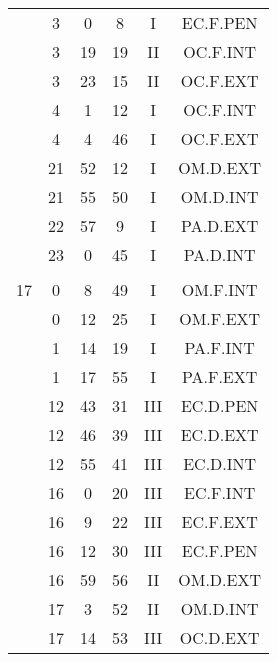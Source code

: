 \documentclass[12pt, a4paper]{article}
\begin{document}
\begin{multicols}{3}
{\begin{tabular}{c c c c c c}
	 	 	 	 & 3 & 0 & 8 & I & EC.F.PEN\\%
	 	 	 	 & 3 & 19 & 19 & II & OC.F.INT\\%
	 	 	 	 & 3 & 23 & 15 & II & OC.F.EXT\\%
	 	 	 	 & 4 & 1 & 12 & I & OC.F.INT\\%
	 	 	 	 & 4 & 4 & 46 & I & OC.F.EXT\\%
	 	 	 	 & 21 & 52 & 12 & I & OM.D.EXT\\%
	 	 	 	 & 21 & 55 & 50 & I & OM.D.INT\\%
	 	 	 	 & 22 & 57 & 9 & I & PA.D.EXT\\%
	 	 	 	 & 23 & 0 & 45 & I & PA.D.INT\\%
	 	 	 	 & & & & & \\%
	 	 	 	17 & 0 & 8 & 49 & I & OM.F.INT\\%
	 	 	 	 & 0 & 12 & 25 & I & OM.F.EXT\\%
	 	 	 	 & 1 & 14 & 19 & I & PA.F.INT\\%
	 	 	 	 & 1 & 17 & 55 & I & PA.F.EXT\\%
	 	 	 	 & 12 & 43 & 31 & III & EC.D.PEN\\%
	 	 	 	 & 12 & 46 & 39 & III & EC.D.EXT\\%
	 	 	 	 & 12 & 55 & 41 & III & EC.D.INT\\%
	 	 	 	 & 16 & 0 & 20 & III & EC.F.INT\\%
	 	 	 	 & 16 & 9 & 22 & III & EC.F.EXT\\%
	 	 	 	 & 16 & 12 & 30 & III & EC.F.PEN\\%
	 	 	 	 & 16 & 59 & 56 & II & OM.D.EXT\\%
	 	 	 	 & 17 & 3 & 52 & II & OM.D.INT\\%
	 	 	 	 & 17 & 14 & 53 & III & OC.D.EXT\\%

\end{tabular}}
\end{multicols}
\end{document}
